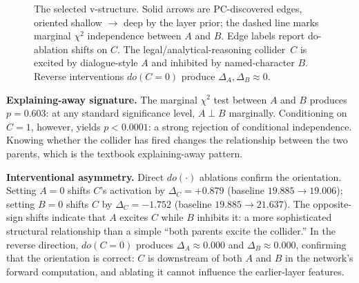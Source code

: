 \documentclass[conference]{IEEEtran}
\begin{document}
\begin{figure}[t]
\centering
{}
\caption{The selected v-structure. Solid arrows are PC-discovered edges, oriented shallow $\to$ deep by the layer prior; the dashed line marks marginal $\chi^{2}$ independence between $A$ and $B$. Edge labels report do-ablation shifts on $C$. The legal/analytical-reasoning collider~$C$ is excited by dialogue-style $A$ and inhibited by named-character $B$. Reverse interventions $do(C=0)$ produce $\Delta_A,\Delta_B \approx 0$.}
\label{fig:vstruct}
\end{figure}

\textbf{Explaining-away signature.} The marginal $\chi^2$ test between $A$ and $B$ produces $p = 0.603$: at any standard significance level, $A \perp B$ marginally. Conditioning on $C = 1$, however, yields $p < 0.0001$: a strong rejection of conditional independence. Knowing whether the collider has fired changes the relationship between the two parents, which is the textbook explaining-away pattern.

\textbf{Interventional asymmetry.} Direct $do(\cdot)$ ablations confirm the orientation. Setting $A = 0$ shifts $C$'s activation by $\Delta_C = +0.879$ (baseline $19.885 \to 19.006$); setting $B = 0$ shifts $C$ by $\Delta_C = -1.752$ (baseline $19.885 \to 21.637$). The opposite-sign shifts indicate that $A$ excites $C$ while $B$ inhibits it: a more sophisticated structural relationship than a simple ``both parents excite the collider.'' In the reverse direction, $do(C = 0)$ produces $\Delta_A \approx 0.000$ and $\Delta_B \approx 0.000$, confirming that the orientation is correct: $C$ is downstream of both $A$ and $B$ in the network's forward computation, and ablating it cannot influence the earlier-layer features.
\end{document}
